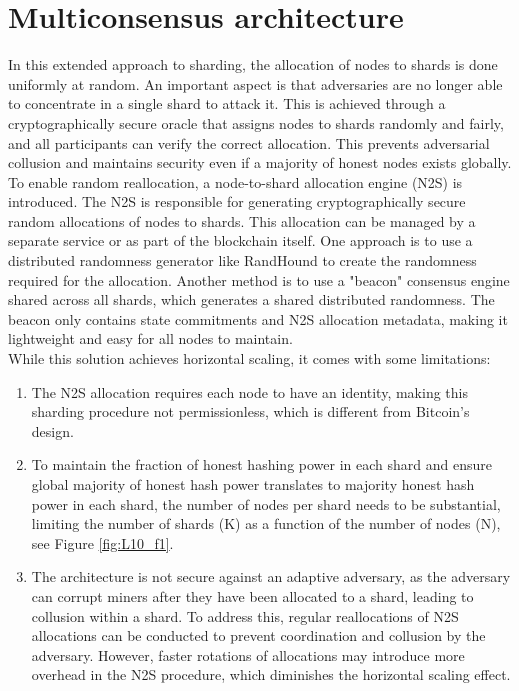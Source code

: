 \section{Multiconsensus architecture} 
In this extended approach to sharding, the allocation of nodes to shards is done uniformly at random. An important aspect is that adversaries are no longer able to concentrate in a single shard to attack it. This is achieved through a cryptographically secure oracle that assigns nodes to shards randomly and fairly, and all participants can verify the correct allocation. This prevents adversarial collusion and maintains security even if a majority of honest nodes exists globally.\\
To enable random reallocation, a node-to-shard allocation engine (N2S) is introduced. The N2S is responsible for generating cryptographically secure random allocations of nodes to shards. This allocation can be managed by a separate service or as part of the blockchain itself. One approach is to use a distributed randomness generator like RandHound to create the randomness required for the allocation. Another method is to use a "beacon" consensus engine shared across all shards, which generates a shared distributed randomness. The beacon only contains state commitments and N2S allocation metadata, making it lightweight and easy for all nodes to maintain.\\
While this solution achieves horizontal scaling, it comes with some limitations:
\begin{enumerate}
	\item The N2S allocation requires each node to have an identity, making this sharding procedure not permissionless, which is different from Bitcoin's design.
	\item To maintain the fraction of honest hashing power in each shard and ensure global majority of honest hash power translates to majority honest hash power in each shard, the number of nodes per shard needs to be substantial, limiting the number of shards (K) as a function of the number of nodes (N), see Figure \ref{fig:L10_f1}.
	\item The architecture is not secure against an adaptive adversary, as the adversary can corrupt miners after they have been allocated to a shard, leading to collusion within a shard. To address this, regular reallocations of N2S allocations can be conducted to prevent coordination and collusion by the adversary. However, faster rotations of allocations may introduce more overhead in the N2S procedure, which diminishes the horizontal scaling effect.
\end{enumerate}
